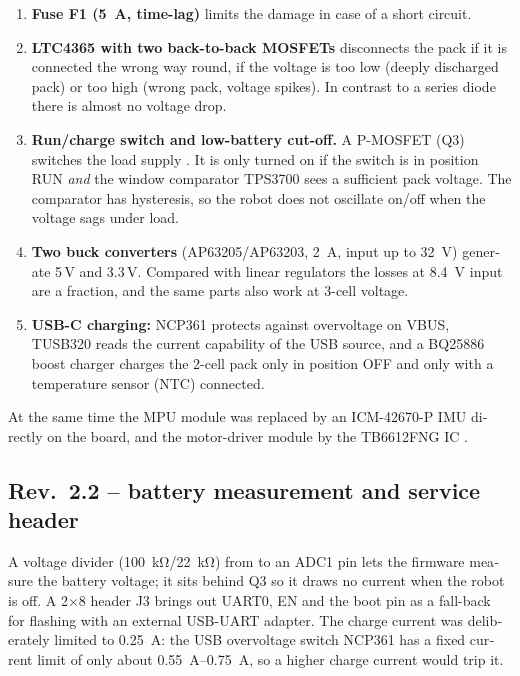 \begin{otherlanguage}{english}
\begin{enumerate}
  \item \textbf{Fuse F1 (\SI{5}{\ampere}, time-lag)} limits the damage in case of a short circuit.
  \item \textbf{LTC4365 with two back-to-back MOSFETs} \cite{ADI_LTC4365} disconnects the pack if it is
        connected the wrong way round, if the voltage is too low (deeply discharged pack) or too high
        (wrong pack, voltage spikes). In contrast to a series diode there is almost no voltage drop.
  \item \textbf{Run/charge switch and low-battery cut-off.} A P-MOSFET (Q3) switches the load supply
        . It is only turned on if the switch is in position RUN \emph{and} the window
        comparator TPS3700 \cite{TI_TPS3700} sees a sufficient pack voltage. The comparator has
        hysteresis, so the robot does not oscillate on/off when the voltage sags under load.
  \item \textbf{Two buck converters} (AP63205/AP63203, \SI{2}{\ampere}, input up to \SI{32}{\volt})
        \cite{Diodes_AP6320x} generate 5\,V and 3.3\,V. Compared with linear regulators the losses
        at \SI{8.4}{\volt} input are a fraction, and the same parts also work at 3-cell voltage.
  \item \textbf{USB-C charging:} NCP361 \cite{onsemi_NCP361} protects against overvoltage on VBUS,
        TUSB320 reads the current capability of the USB source, and a BQ25886 boost charger
        \cite{TI_BQ25886} charges the 2-cell pack only in position OFF and only with a temperature
        sensor (NTC) connected.
\end{enumerate}
At the same time the MPU module was replaced by an ICM-42670-P IMU \cite{TDK_ICM42670P} directly on
the board, and the motor-driver module by the TB6612FNG IC \cite{Toshiba_TB6612}.

\subsection{Rev.~2.2 -- battery measurement and service header}
A voltage divider (\SI{100}{\kilo\ohm}/\SI{22}{\kilo\ohm}) from  to an ADC1 pin lets the
firmware measure the battery voltage; it sits behind Q3 so it draws no current when the robot is off.
A 2$\times$8 header J3 brings out UART0, EN and the boot pin as a fall-back for flashing with an
external USB-UART adapter. The charge current was deliberately limited to \SI{0.25}{\ampere}: the USB
overvoltage switch NCP361 has a fixed current limit of only about \SIrange{0.55}{0.75}{\ampere}, so a
higher charge current would trip it.


\end{otherlanguage}
